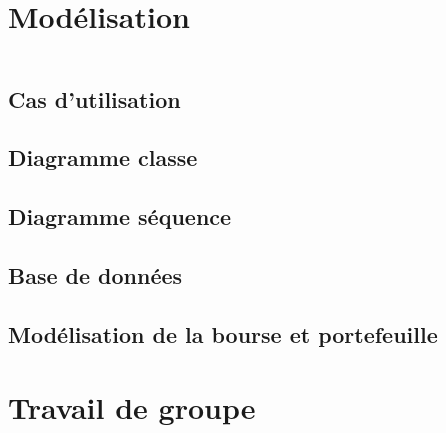 \documentclass{beamer}
\begin{document}
	        
	 \section{Modélisation}
        \begin{frame}
            \begin{columns}[t]
  				\begin{column}{5cm}
  					\tableofcontents[sections={1-4}, currentsection, hideothersubsections]
  				\end{column}
  				\begin{column}{5cm}
  				\tableofcontents[sections={5-9}, currentsection, hideothersubsections]
  				\end{column}
  			\end{columns}
        \end{frame}
        \subsection{Cas d'utilisation}
	        
	    \subsection{Diagramme classe}
	            
		\subsection{Diagramme séquence}
	        
	    \subsection{Base de données}
	        
	    \subsection{Modélisation de la bourse et portefeuille}
	        
    
    \section{Travail de groupe}
        \begin{frame}
            \begin{columns}[t]
  				\begin{column}{5cm}
  					\tableofcontents[sections={1-4}, currentsection, hideothersubsections]
  				\end{column}
  				\begin{column}{5cm}
  				\tableofcontents[sections={5-9}, currentsection, hideothersubsections]
  				\end{column}
  			\end{columns}
        \end{frame}
\end{document}
